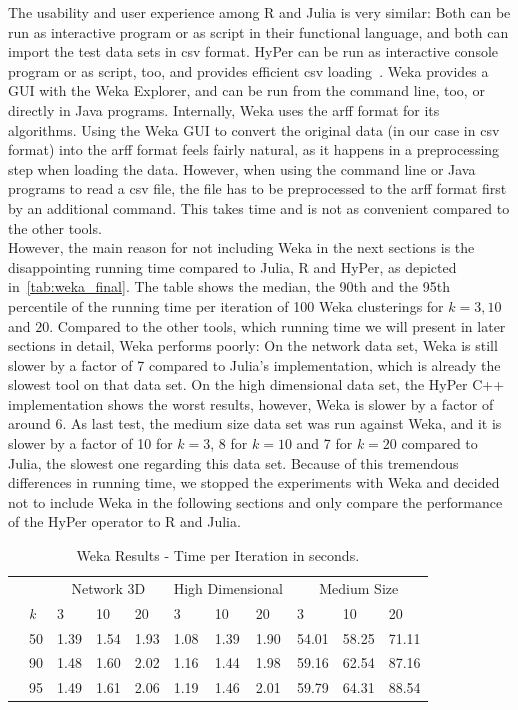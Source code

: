 The usability and user experience among R and Julia is very similar: Both can be run as interactive program or as script in their functional language, and both can import the test data sets in csv format. HyPer can be run as interactive console program or as script, too, and provides efficient csv loading~\parencite{hypercsv}. Weka provides a GUI with the Weka Explorer, and can be run from the command line, too, or directly in Java programs. Internally, Weka uses the arff format for its algorithms. Using the Weka GUI to convert the original data (in our case in csv format) into the arff format feels fairly natural, as it happens in a preprocessing step when loading the data. However, when using the command line or Java programs to read a csv file, the file has to be preprocessed to the arff format first by an additional command. This takes time and is not as convenient compared to the other tools.
\\
However, the main reason for not including Weka in the next sections is the disappointing running time compared to Julia, R and HyPer, as depicted in~\autoref{tab:weka_final}. The table shows the median, the 90th and the 95th percentile of the running time per iteration of 100 Weka clusterings for $k = 3, 10$ and $20$. Compared to the other tools, which running time we will present in later sections in detail, Weka performs poorly: On the network data set, Weka is still slower by a factor of 7 compared to Julia's implementation, which is already the slowest tool on that data set. On the high dimensional data set, the HyPer C++ implementation shows the worst results, however, Weka is slower by a factor of around 6. As last test, the medium size data set was run against Weka, and it is slower by a factor of 10 for $k = 3$, 8 for $k = 10$ and 7 for $k = 20$ compared to Julia, the slowest one regarding this data set. Because of this tremendous differences in running time, we stopped the experiments with Weka and decided not to include Weka in the following sections and only compare the performance of the HyPer operator to R and Julia.

\begin{table}[htsb]
  \caption[Weka Results - Time per Iteration]{Weka Results - Time per Iteration in seconds.}
  \label{tab:weka_final}
  \centering
  \begin{tabular}{ll l l l |l l l |l l l }
    \toprule
      &  & \multicolumn{3}{c}{Network 3D} & \multicolumn{3}{c}{High Dimensional} & \multicolumn{3}{c}{Medium Size}  \\
      & \emph{k} & 3 & 10 & 20 & 3 & 10 & 20 & 3 & 10 & 20 \\
    \midrule
      \parbox[t]{2mm}{} & 50  & 1.39 & 1.54 & 1.93 & 1.08 & 1.39 & 1.90 & 54.01 & 58.25 & 71.11 \\
      & 90  & 1.48 & 1.60 & 2.02 & 1.16 & 1.44 & 1.98 &59.16 & 62.54 & 87.16 \\
      & 95  & 1.49 & 1.61 & 2.06 & 1.19 & 1.46 & 2.01 & 59.79 & 64.31 & 88.54 \\
    \bottomrule
  \end{tabular}
\end{table}



